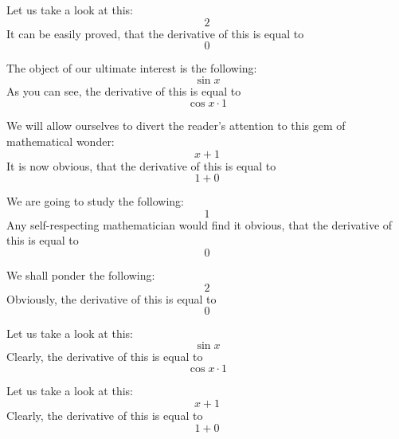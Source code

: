 \documentclass{article}
\begin{document}
Let us take a look at this:
\begin{equation}
2 
\end{equation}
It can be easily proved, that the derivative of this is equal to
\begin{equation}
0 
\end{equation}

The object of our ultimate interest is the following:
\begin{equation}
\sin x 
\end{equation}
As you can see, the derivative of this is equal to
\begin{equation}
\cos x \cdot 1 
\end{equation}

We will allow ourselves to divert the reader's attention to this gem of mathematical wonder:
\begin{equation}
x + 1 
\end{equation}
It is now obvious, that the derivative of this is equal to
\begin{equation}
1 + 0 
\end{equation}

We are going to study the following:
\begin{equation}
1 
\end{equation}
Any self-respecting mathematician would find it obvious, that the derivative of this is equal to
\begin{equation}
0 
\end{equation}

We shall ponder the following:
\begin{equation}
2 
\end{equation}
Obviously, the derivative of this is equal to
\begin{equation}
0 
\end{equation}

Let us take a look at this:
\begin{equation}
\sin x 
\end{equation}
Clearly, the derivative of this is equal to
\begin{equation}
\cos x \cdot 1 
\end{equation}

Let us take a look at this:
\begin{equation}
x + 1 
\end{equation}
Clearly, the derivative of this is equal to
\begin{equation}
1 + 0 
\end{equation}
\end{document}
